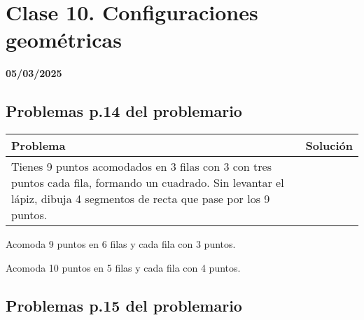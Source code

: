 \chapter{Clase 10. Configuraciones geométricas}
\textbf{05/03/2025}

\section{Problemas p.14 del problemario}

\begin{tabular}{l c}
    Problema & Solución \\\hline
    
    Tienes 9 puntos acomodados en 3 filas con 3 con tres puntos cada fila, formando un cuadrado. Sin levantar el lápiz, dibuja 4 segmentos de recta que pase por los 9 puntos. & 
\end{tabular}


\begin{excercise}
    Acomoda 9 puntos en 6 filas y cada fila con 3 puntos.
\end{excercise}

\begin{excercise}
    Acomoda 10 puntos en 5 filas y cada fila con 4 puntos.
\end{excercise}

\section{Problemas p.15 del problemario}

